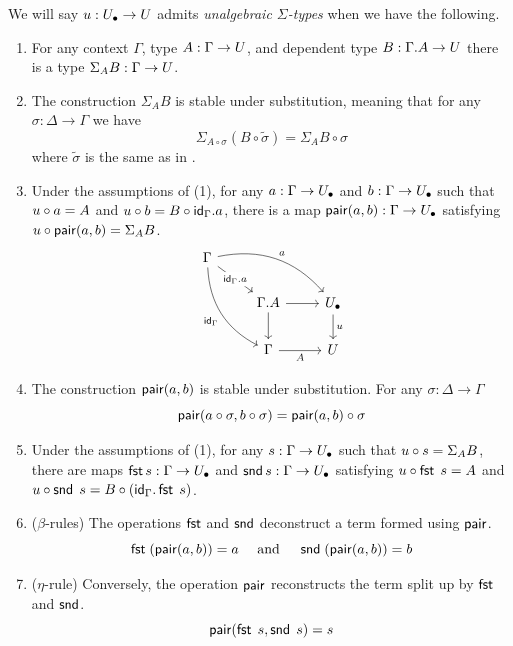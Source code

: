\begin{definition}
  \label{def:elementary-sigma}
  We will say ${u} : {U_\bullet} \to U$ admits
  \emph{unalgebraic $\Sigma$-types}
  when we have the following.
  \begin{enumerate}
  \item 
    For any context $\Gamma$, type $A : \Gamma \to U$,
    and dependent type $B : \Gamma . A \to U$
    there is a type $\Sigma_A B : \Gamma \to U$.
  \item
    The construction $\Sigma_A B$ is stable under substitution,
    meaning that for any $\sigma : \Delta \to \Gamma$ we have
    \[
      \Sigma_{A \circ \sigma} (B \circ \tilde{\sigma}) =
      \Sigma_{A} B \circ \sigma
    \]
    where $\tilde{\sigma}$ is the same as in .
  \item
    Under the assumptions of (1),
    for any $a : \Gamma \to {U_\bullet}$ and $b:\Gamma\to {U_\bullet}$
    such that ${u} \circ a = A$ and ${u} \circ b = B \circ \mathsf{id}_\Gamma . a $,
    there is a map $\mathsf{pair} (a,b) : \Gamma \to {U_\bullet}$
    satisfying ${u} \circ \mathsf{pair} (a,b)  = \Sigma_A B$. 
    \[
\begin{tikzcd}
	\Gamma \\
	& {\Gamma . A} & \Ulow \\
	& \Gamma & \U
	\arrow["{\id_\Gamma . a}"{description}, from=1-1, to=2-2]
	\arrow["a", bend left, from=1-1, to=2-3]
	\arrow["{\id_\Gamma}"', bend right, from=1-1, to=3-2]
	\arrow[from=2-2, to=2-3]
	\arrow[from=2-2, to=3-2]
	\arrow["\uu", from=2-3, to=3-3]
	\arrow["A"', from=3-2, to=3-3]
\end{tikzcd}
    \]
  \item
    The construction $\mathsf{pair} (a, b)$ is stable under substitution.
    For any $\sigma : \Delta \to \Gamma$
    \[
      \mathsf{pair} (a \circ \sigma,b \circ \sigma) =
       \mathsf{pair}(a , b) \circ \sigma
    \]
  \item
    Under the assumptions of (1),
    for any $s : \Gamma \to {U_\bullet}$
    such that $ {u} \circ s = \Sigma_A B$,
    there are maps $\mathop{\mathsf{fst}} s : \Gamma  \to {U_\bullet}$
    and $\mathop{\mathsf{snd}} s : \Gamma  \to {U_\bullet}$
    satisfying ${u} \circ \mathop{\mathsf{fst}}\; s = A$
    and ${u} \circ \mathop{\mathsf{snd}} \; s = B \circ (\mathsf{id}_\Gamma . \mathop{\mathsf{fst}}\; s)$.
  \item ($\beta$-rules) The operations 
    $\mathop{\mathsf{fst}}$ and $\mathop{\mathsf{snd}}$ deconstruct a term formed using $\mathsf{pair}$.
    \[ \mathop{\mathsf{fst}} \;(\mathsf{pair}(a, b)) = a \quad \text{ and } 
    \quad \mathop{\mathsf{snd}} \; (\mathsf{pair} (a, b)) = b\]
  \item ($\eta$-rule) Conversely, the operation $\mathsf{pair}$
    reconstructs the term split up by $\mathop{\mathsf{fst}}$ and $\mathop{\mathsf{snd}}$.
  \[\mathsf{pair} (\mathop{\mathsf{fst}} \;s, \mathop{\mathsf{snd}} \;s) = s\]
  \end{enumerate}
\end{definition}

